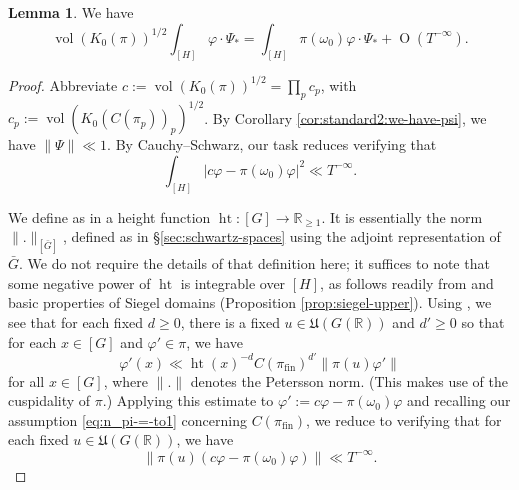 \documentclass[reqno]{amsart}
\DeclareMathOperator{\htt}{ht}
\def\O{\operatorname{O}}
\DeclareMathOperator{\fin}{fin}
\DeclareMathOperator{\vol}{vol}
\theoremstyle{plain} \newtheorem{theorem} {Theorem}
\theoremstyle{definition} \newtheorem{definition} [theorem] {Definition}
\theoremstyle{itplain} %
\newtheorem{lemma}[theorem]{Lemma}
\numberwithin{equation}{section}
\numberwithin{theorem}{section}
\renewcommand{\geq}{\geqslant}
\begin{document}
\begin{lemma}\label{lem:standard:we-have-begin}
  We have
  \begin{equation}\label{eq:volk_0pi-int_h-varph}
    \vol(K_0(\pi))^{1/2}
    \int_{[H]} \varphi \cdot \Psi_{\ast}
    =
    \int _{[H]} \pi(\omega_0) \varphi \cdot \Psi_{\ast}
    + \O(T^{-\infty}).
  \end{equation}
\end{lemma}
\begin{proof}
  Abbreviate $c := \vol(K_0(\pi))^{1/2} = \prod_p c_p$, with $c_p := \vol(K_0(C(\pi_p))_p)^{1/2}$.  By Corollary \ref{cor:standard2:we-have-psi}, we have $\|\Psi\| \ll 1$.  By Cauchy--Schwarz, our task reduces verifying that
  \begin{equation*}
    \int _{[H]} | c \varphi - \pi(\omega_0) \varphi |^2 \ll T^{-\infty}.
  \end{equation*}

  We define as in \cite[\S2.1.7]{michel-2009} a height function $\htt : [G] \rightarrow \mathbb{R}_{\geq 1}$.  It is essentially the norm $\|.\|_{[\bar{G}]}$, defined as in \S\ref{sec:schwartz-spaces} using the adjoint representation of $\bar{G}$.  We do not require the details of that definition here; it suffices to note that some negative power of $\htt$ is integrable over $[H]$, as follows readily from \cite[\S2.1.7]{michel-2009} and basic properties of Siegel domains (Proposition \ref{prop:siegel-upper}).  Using \cite[\S2.4, (S2a), (S3a)]{michel-2009}, we see that for each fixed $d \geq 0$, there is a fixed $u \in \mathfrak{U}(G(\mathbb{R}))$ and $d' \geq 0$ so that for each $x \in [G]$ and $\varphi ' \in \pi$, we have
  \begin{equation*}
  \varphi '(x) \ll \htt(x)^{-d} C(\pi_{\fin})^{d'} \|\pi(u) \varphi' \|
\end{equation*}
for all $x \in [G]$, where $\|.\|$ denotes the Petersson norm.  (This makes use of the cuspidality of $\pi$.)  Applying this estimate to $\varphi ' := c \varphi - \pi(\omega_0) \varphi$ and recalling our assumption \eqref{eq:n_pi-=-to1} concerning $C(\pi_{\fin})$, we reduce to verifying that for each fixed $u \in \mathfrak{U}(G(\mathbb{R}))$, we have
\begin{equation}\label{eq:c-varphi-piomega_0}
\|\pi(u) (c \varphi - \pi(\omega_0) \varphi) \| \ll T^{-\infty}.
\end{equation}



\end{proof}
\end{document}
